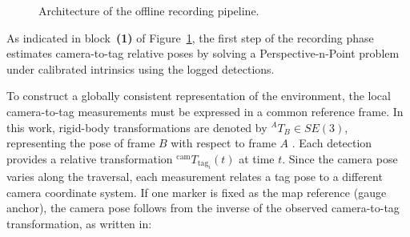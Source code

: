 \documentclass[a4paper,11pt]{article}
\begin{document}
\begin{figure}[h]
{
	}
	\caption{Architecture of the offline recording pipeline.}
	\label{fig:recording_pipeline}
\end{figure}

As indicated in block~\textbf{(1)} of Figure~\ref{fig:recording_pipeline}, the first step of the recording phase estimates camera-to-tag relative poses by solving a Perspective-n-Point problem under calibrated intrinsics \cite{Hartley2004} using the logged detections.

To construct a globally consistent representation of the environment, the local camera-to-tag measurements must be expressed in a common reference frame. In this work, rigid-body transformations are denoted by ${}^{A}\!T_{B} \in SE(3)$, representing the pose of frame $B$ with respect to frame $A$ \cite{barfoot2017state}. Each detection provides a relative transformation ${}^{\text{cam}}\!T_{\text{tag}_i}(t)$ at time $t$. Since the camera pose varies along the traversal, each measurement relates a tag pose to a different camera coordinate system. If one marker is fixed as the map reference (gauge anchor), the camera pose follows from the inverse of the observed camera-to-tag transformation, as written in:
\end{document}
